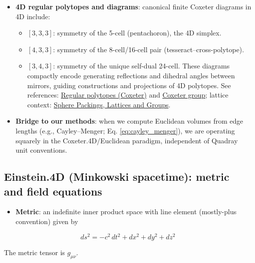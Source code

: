 \documentclass[
  10pt,
]{article}
\providecommand{\tightlist}{%
  \setlength{\itemsep}{0pt}\setlength{\parskip}{0pt}}
\begin{document}
\begin{itemize}
\tightlist
\item
  \textbf{4D regular polytopes and diagrams}: canonical finite Coxeter
  diagrams in 4D include:

  \begin{itemize}
  \tightlist
  \item
    \([3,3,3]\): symmetry of the 5-cell (pentachoron), the 4D simplex.
  \item
    \([4,3,3]\): symmetry of the 8-cell/16-cell pair
    (tesseract--cross-polytope).
  \item
    \([3,4,3]\): symmetry of the unique self-dual 24-cell. These
    diagrams compactly encode generating reflections and dihedral angles
    between mirrors, guiding constructions and projections of 4D
    polytopes. See references:
    \href{https://en.wikipedia.org/wiki/Regular_polytope}{Regular
    polytopes (Coxeter)} and
    \href{https://en.wikipedia.org/wiki/Coxeter_group}{Coxeter group};
    lattice context:
    \href{https://link.springer.com/book/10.1007/978-1-4757-6568-7}{Sphere
    Packings, Lattices and Groups}.
  \end{itemize}
\item
  \textbf{Bridge to our methods}: when we compute Euclidean volumes from
  edge lengths (e.g., Cayley--Menger; Eq. \eqref{eq:cayley_menger}), we
  are operating squarely in the Coxeter.4D/Euclidean paradigm,
  independent of Quadray unit conventions.
\end{itemize}

\hypertarget{einstein.4d-minkowski-spacetime-metric-and-field-equations}{%
\subsection{Einstein.4D (Minkowski spacetime): metric and field
equations}\label{einstein.4d-minkowski-spacetime-metric-and-field-equations}}

\begin{itemize}
\tightlist
\item
  \textbf{Metric}: an indefinite inner product space with line element
  (mostly-plus convention) given by
\end{itemize}

\begin{equation}\label{eq:einstein_line_element_methods}
ds^2 = -c^2\,dt^2 + dx^2 + dy^2 + dz^2
\end{equation}

The metric tensor is \(g_{\mu\nu}\).
\end{document}
